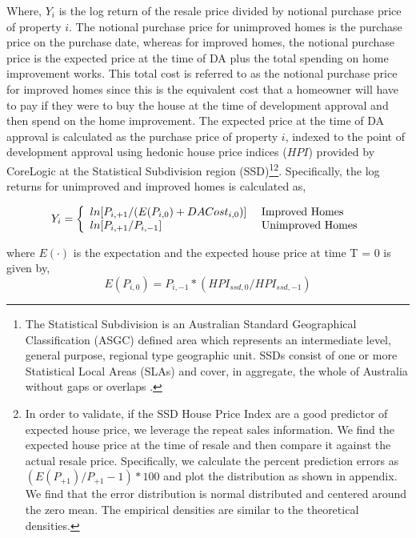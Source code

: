 \documentclass[AEJ,reqno, draftmode]{AEA} %
\begin{document}
Where, $Y_i$ is the log return of the resale price divided by notional purchase price of property $i$. The notional purchase price for unimproved homes is the purchase price on the purchase date, whereas for improved homes, the notional purchase price is the expected price at the time of DA plus the total spending on home improvement works. This total cost is referred to as the notional purchase price for improved homes since this is the equivalent cost that a homeowner will have to pay if they were to buy the house at the time of development approval and then spend on the home improvement. The expected price at the time of DA approval is calculated as the purchase price of property $i$, indexed to the point of development approval using hedonic house price indices ($HPI$) provided by CoreLogic at the Statistical Subdivision region (SSD)\footnote{The Statistical Subdivision is an Australian Standard Geographical Classification (ASGC) defined area which represents an intermediate level, general purpose, regional type geographic unit. SSDs consist of one or more Statistical Local Areas (SLAs) and cover, in aggregate, the whole of Australia without gaps or overlaps \citep{SSD}.}\footnote{In order to validate, if the SSD House Price Index are a good predictor of expected house price, we leverage the repeat sales information. We find the expected house price at the time of resale and then compare it against the actual resale price. Specifically, we calculate the percent prediction errors as $(E(P_{+1})/P_{+1}-1)*100$ and plot the distribution as shown in appendix. We find that the error distribution is normal distributed and centered around the zero mean. The empirical densities are similar to the theoretical densities.}. Specifically, the log returns for unimproved and improved homes is calculated as,

\begin{equation}
    Y_i = \left\{
    \begin{array}{l l}
      ln[P_{i,+1}/(E(P_{i,0})+ DACost_{i,0})] & \text{ Improved Homes}\\
      ln[P_{i,+1}/P_{i,-1}] & \text{ Unimproved Homes} \\
    \end{array} \right.
\end{equation}

where $E(\cdot)$ is the expectation and the expected house price at time T = 0 is given by, \begin{equation}
    E(P_{i,0}) = P_{i,-1} * (HPI_{ssd,0} / HPI_{ssd,-1})
\end{equation}
\end{document}
